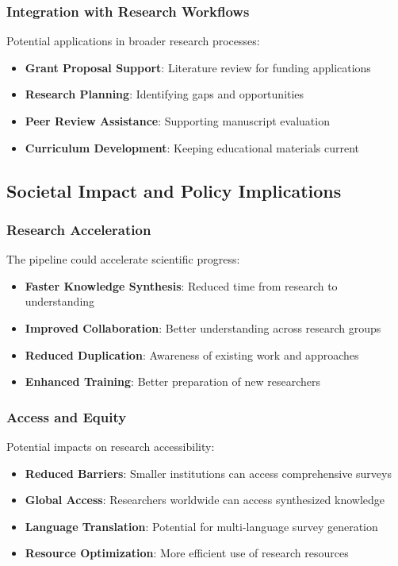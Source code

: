 \subsubsection{Integration with Research Workflows}

Potential applications in broader research processes:

\begin{itemize}
    \item \textbf{Grant Proposal Support}: Literature review for funding applications
    \item \textbf{Research Planning}: Identifying gaps and opportunities
    \item \textbf{Peer Review Assistance}: Supporting manuscript evaluation
    \item \textbf{Curriculum Development}: Keeping educational materials current
\end{itemize}

\subsection{Societal Impact and Policy Implications}

\subsubsection{Research Acceleration}

The pipeline could accelerate scientific progress:

\begin{itemize}
    \item \textbf{Faster Knowledge Synthesis}: Reduced time from research to understanding
    \item \textbf{Improved Collaboration}: Better understanding across research groups
    \item \textbf{Reduced Duplication}: Awareness of existing work and approaches
    \item \textbf{Enhanced Training}: Better preparation of new researchers
\end{itemize}

\subsubsection{Access and Equity}

Potential impacts on research accessibility:

\begin{itemize}
    \item \textbf{Reduced Barriers}: Smaller institutions can access comprehensive surveys
    \item \textbf{Global Access}: Researchers worldwide can access synthesized knowledge
    \item \textbf{Language Translation}: Potential for multi-language survey generation
    \item \textbf{Resource Optimization}: More efficient use of research resources
\end{itemize}


